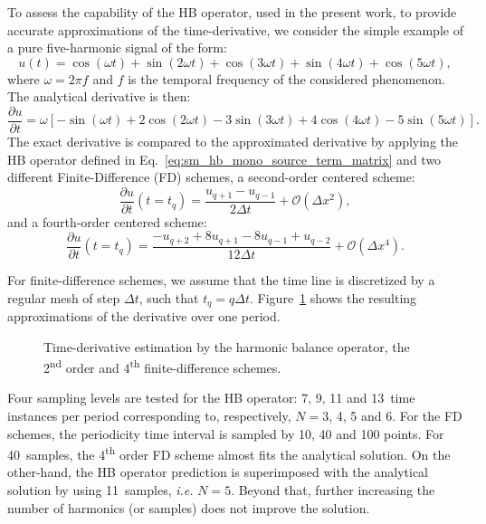 
To assess the capability of the HB operator, used in the present work, to
provide accurate approximations of the time-derivative, 
we consider the simple example of a pure
five-harmonic signal of the form:
\begin{equation}
    \label{eq:sum_sin}
    u(t) = \cos(\omega t) + \sin(2 \omega t) +
    \cos(3 \omega t) + \sin(4 \omega t) + \cos(5 \omega t),
\end{equation}
where $\omega = 2 \pi f$ and $f$ is the temporal frequency of
the considered phenomenon.
The analytical derivative is then:
\begin{equation}
    \label{eq:sum_sin_deriv}
    \frac{\partial u}{\partial t} = 
    \omega\left[ -\sin(\omega t) + 
    2\cos(2 \omega t) -
    3\sin(3 \omega t) + 
    4\cos(4 \omega t) -
    5\sin(5 \omega t)\right].
\end{equation}
The exact derivative is compared to the approximated derivative by applying 
the HB operator defined in Eq.~\eqref{eq:sm_hb_mono_source_term_matrix}
and two different Finite-Difference (FD) schemes,
a second-order centered scheme:
\begin{equation}
    \frac{\partial u}{\partial t} (t=t_q) =
    \frac{u_{q+1} - u_{q-1}}{2 \Delta t} + \mathcal{O} (\Delta x^2),
    \label{eq:hb_op_center2}
\end{equation}
and a fourth-order centered scheme:
\begin{equation}
    \frac{\partial u}{\partial t} (t=t_q) =
    \frac{-u_{q+2} + 8 u_{q+1} - 8 u_{q-1} + u_{q-2}}{12\Delta t}
    + \mathcal{O} (\Delta x^4).
    \label{eq:hb_op_center4}
\end{equation}

For finite-difference schemes, 
we assume that the time line is discretized 
by a regular mesh of step $\Delta t$, such that $t_q = q \Delta t$.
Figure~\ref{fig:hb_operator_sample} shows the resulting approximations 
of the derivative over one period.
\begin{figure}[htp]
  \centering
  \caption{Time-derivative estimation by the harmonic balance operator,
  the 2\textsuperscript{nd} order and 4\textsuperscript{th} finite-difference schemes.}
  \label{fig:hb_operator_sample}
\end{figure}
Four sampling levels
are tested for the HB operator: 7, 9, 11 and 13~time instances per period
corresponding to, respectively, $N=3$, 4, 5 and 6.
For the FD schemes, the periodicity time interval is sampled by
10, 40 and 100 points.
For 40~samples, the 4\textsuperscript{th} order FD
scheme almost fits the analytical solution. On the other-hand,
the HB operator prediction is superimposed with the analytical solution
by using 11~samples, \emph{i.e.} $N=5$. Beyond that, further increasing the
number of harmonics (or samples)
does not improve the solution.

